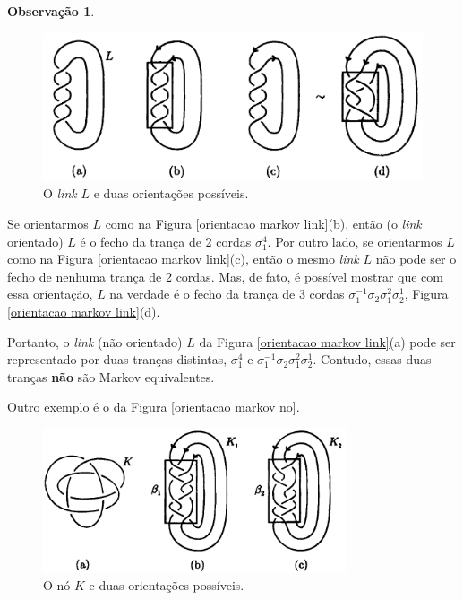 \documentclass[a4paper,portuguese,11pt,twoside, leqno]{book}
\theoremstyle{definition}
\newtheorem{remark}{Observação}[section]
\begin{document}
\begin{remark}
		\begin{figure}[H]
			\begin{center}
				\includegraphics[width=12cm]{Images/orientacao_markov_link.png}
			\end{center}\caption{O \textit{link} $L$ e duas orientações possíveis.}\label{orientacao markov link}
		\end{figure}
		\par\vspace{0.3cm} Se orientarmos $L$ como na Figura \eqref{orientacao markov link}(b), então (o \textit{link} orientado) $L$ é o fecho da trança de 2 cordas $\sigma_1^4$. Por outro lado, se orientarmos $L$ como na Figura \eqref{orientacao markov link}(c), então o mesmo \textit{link} $L$ não pode ser o fecho de nenhuma trança de 2 cordas. Mas, de fato, é possível mostrar que com essa orientação, $L$ na verdade é o fecho da trança de 3 cordas $\sigma_1^{-1}\sigma_2\sigma_1^{2}\sigma_2^{1}$, Figura \eqref{orientacao markov link}(d).
		\par\vspace{0.3cm} Portanto, o \textit{link} (não orientado) $L$ da Figura \eqref{orientacao markov link}(a) pode ser representado por duas tranças distintas, $\sigma_1^4$ e $\sigma_1^{-1}\sigma_2\sigma_1^{2}\sigma_2^{1}$. Contudo, essas duas tranças \textbf{não} são Markov equivalentes. 
		\par\vspace{0.3cm} Outro exemplo é o da Figura \eqref{orientacao markov no}.
		
		\begin{figure}[H]
			\begin{center}
				\includegraphics[width=9cm]{Images/orientacao_markov_no.png}
			\end{center}\caption{O nó $K$ e duas orientações possíveis.}\label{orientacao markov no}
		\end{figure}
		

\end{remark}
\end{document}
